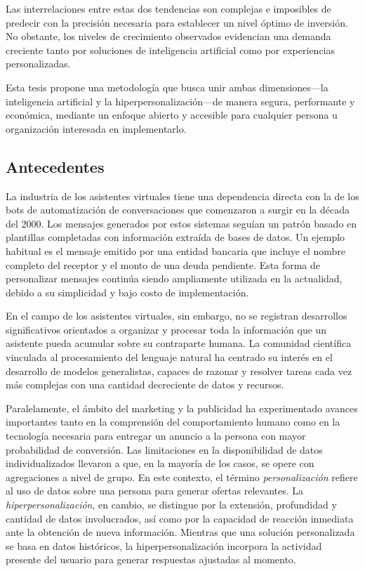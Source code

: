 Las interrelaciones entre estas dos tendencias son complejas e imposibles de predecir con la precisión necesaria para establecer un nivel óptimo de inversión. No obstante, los niveles de crecimiento observados evidencian una demanda creciente tanto por soluciones de inteligencia artificial como por experiencias personalizadas.

Esta tesis propone una metodología que busca unir ambas dimensiones—la inteligencia artificial y la hiperpersonalización—de manera segura, performante y económica, mediante un enfoque abierto y accesible para cualquier persona u organización interesada en implementarlo.

\subsection{Antecedentes}

La industria de los asistentes virtuales tiene una dependencia directa con la de los bots de automatización de conversaciones que comenzaron a surgir en la década del 2000. Los mensajes generados por estos sistemas seguían un patrón basado en plantillas completadas con información extraída de bases de datos. Un ejemplo habitual es el mensaje emitido por una entidad bancaria que incluye el nombre completo del receptor y el monto de una deuda pendiente. Esta forma de personalizar mensajes continúa siendo ampliamente utilizada en la actualidad, debido a su simplicidad y bajo costo de implementación.

En el campo de los asistentes virtuales, sin embargo, no se registran desarrollos significativos orientados a organizar y procesar toda la información que un asistente pueda acumular sobre su contraparte humana. La comunidad científica vinculada al procesamiento del lenguaje natural ha centrado su interés en el desarrollo de modelos generalistas, capaces de razonar y resolver tareas cada vez más complejas con una cantidad decreciente de datos y recursos.

Paralelamente, el ámbito del marketing y la publicidad ha experimentado avances importantes tanto en la comprensión del comportamiento humano como en la tecnología necesaria para entregar un anuncio a la persona con mayor probabilidad de conversión. Las limitaciones en la disponibilidad de datos individualizados llevaron a que, en la mayoría de los casos, se opere con agregaciones a nivel de grupo. En este contexto, el término \textit{personalización} refiere al uso de datos sobre una persona para generar ofertas relevantes. La \textit{hiperpersonalización}, en cambio, se distingue por la extensión, profundidad y cantidad de datos involucrados, así como por la capacidad de reacción inmediata ante la obtención de nueva información. Mientras que una solución personalizada se basa en datos históricos, la hiperpersonalización incorpora la actividad presente del usuario para generar respuestas ajustadas al momento.


